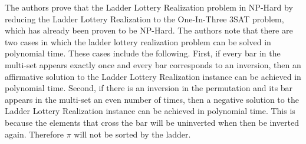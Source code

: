 \pagebreak
The authors prove that the Ladder Lottery Realization problem in NP-Hard
by reducing the Ladder Lottery Realization to the One-In-Three 3SAT problem, 
which has already been proven to be NP-Hard.
The authors note that there are two cases in which the ladder lottery
realization problem can be solved in polynomial time. These cases 
include the following. First, if every bar in the multi-set appears
exactly once and every bar corresponds to an inversion, 
then an affirmative solution to the Ladder Lottery Realization 
instance can be achieved in polynomial time. 
Second, if there is an inversion in the permutation and its bar appears in the multi-set an even 
number of times, then a negative solution to
the Ladder Lottery Realization instance
can be achieved in polynomial time. This is because the elements that cross the bar will 
be uninverted when then be inverted again. Therefore $\pi$ will not be sorted by the ladder.\par